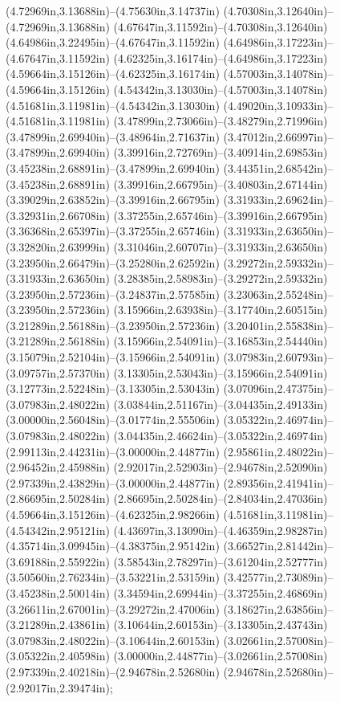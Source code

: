 (4.72969in,3.13688in)--(4.75630in,3.14737in) (4.70308in,3.12640in)--(4.72969in,3.13688in) (4.67647in,3.11592in)--(4.70308in,3.12640in) (4.64986in,3.22495in)--(4.67647in,3.11592in) (4.64986in,3.17223in)--(4.67647in,3.11592in) (4.62325in,3.16174in)--(4.64986in,3.17223in) (4.59664in,3.15126in)--(4.62325in,3.16174in) (4.57003in,3.14078in)--(4.59664in,3.15126in) (4.54342in,3.13030in)--(4.57003in,3.14078in) (4.51681in,3.11981in)--(4.54342in,3.13030in) (4.49020in,3.10933in)--(4.51681in,3.11981in) (3.47899in,2.73066in)--(3.48279in,2.71996in) (3.47899in,2.69940in)--(3.48964in,2.71637in) (3.47012in,2.66997in)--(3.47899in,2.69940in) (3.39916in,2.72769in)--(3.40914in,2.69853in) (3.45238in,2.68891in)--(3.47899in,2.69940in) (3.44351in,2.68542in)--(3.45238in,2.68891in) (3.39916in,2.66795in)--(3.40803in,2.67144in) (3.39029in,2.63852in)--(3.39916in,2.66795in) (3.31933in,2.69624in)--(3.32931in,2.66708in) (3.37255in,2.65746in)--(3.39916in,2.66795in) (3.36368in,2.65397in)--(3.37255in,2.65746in) (3.31933in,2.63650in)--(3.32820in,2.63999in) (3.31046in,2.60707in)--(3.31933in,2.63650in) (3.23950in,2.66479in)--(3.25280in,2.62592in) (3.29272in,2.59332in)--(3.31933in,2.63650in) (3.28385in,2.58983in)--(3.29272in,2.59332in) (3.23950in,2.57236in)--(3.24837in,2.57585in) (3.23063in,2.55248in)--(3.23950in,2.57236in) (3.15966in,2.63938in)--(3.17740in,2.60515in) (3.21289in,2.56188in)--(3.23950in,2.57236in) (3.20401in,2.55838in)--(3.21289in,2.56188in) (3.15966in,2.54091in)--(3.16853in,2.54440in) (3.15079in,2.52104in)--(3.15966in,2.54091in) (3.07983in,2.60793in)--(3.09757in,2.57370in) (3.13305in,2.53043in)--(3.15966in,2.54091in) (3.12773in,2.52248in)--(3.13305in,2.53043in) (3.07096in,2.47375in)--(3.07983in,2.48022in) (3.03844in,2.51167in)--(3.04435in,2.49133in) (3.00000in,2.56048in)--(3.01774in,2.55506in) (3.05322in,2.46974in)--(3.07983in,2.48022in) (3.04435in,2.46624in)--(3.05322in,2.46974in) (2.99113in,2.44231in)--(3.00000in,2.44877in) (2.95861in,2.48022in)--(2.96452in,2.45988in) (2.92017in,2.52903in)--(2.94678in,2.52090in) (2.97339in,2.43829in)--(3.00000in,2.44877in) (2.89356in,2.41941in)--(2.86695in,2.50284in) (2.86695in,2.50284in)--(2.84034in,2.47036in) (4.59664in,3.15126in)--(4.62325in,2.98266in) (4.51681in,3.11981in)--(4.54342in,2.95121in) (4.43697in,3.13090in)--(4.46359in,2.98287in) (4.35714in,3.09945in)--(4.38375in,2.95142in) (3.66527in,2.81442in)--(3.69188in,2.55922in) (3.58543in,2.78297in)--(3.61204in,2.52777in) (3.50560in,2.76234in)--(3.53221in,2.53159in) (3.42577in,2.73089in)--(3.45238in,2.50014in) (3.34594in,2.69944in)--(3.37255in,2.46869in) (3.26611in,2.67001in)--(3.29272in,2.47006in) (3.18627in,2.63856in)--(3.21289in,2.43861in) (3.10644in,2.60153in)--(3.13305in,2.43743in) (3.07983in,2.48022in)--(3.10644in,2.60153in) (3.02661in,2.57008in)--(3.05322in,2.40598in) (3.00000in,2.44877in)--(3.02661in,2.57008in) (2.97339in,2.40218in)--(2.94678in,2.52680in) (2.94678in,2.52680in)--(2.92017in,2.39474in);
